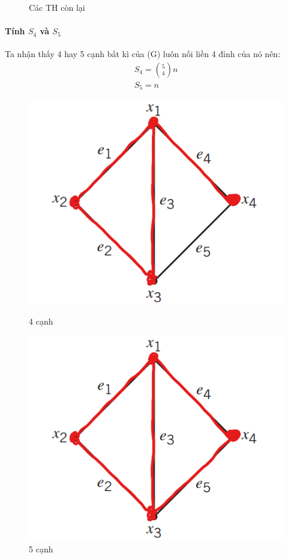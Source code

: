 \documentclass[main.tex]{subfiles}
\begin{document}
\begin{figure}[H]
\begin{minipage}{0.25\textwidth}
\captionsetup{labelformat=empty}
\caption{Các TH còn lại}
\end{minipage}
\end{figure}

\paragraph*{Tính $S_4$ và $S_5$} 
Ta nhận thấy 4 hay 5 cạnh bất kì của (G) luôn nối liền 4 đỉnh của nó nên:
\begin{gather*}
S_4 = {5\choose4}n \\
S_5 = n    
\end{gather*}

\begin{figure}[H]
\centering
\begin{minipage}{0.25\textwidth}
\includegraphics[width=\textwidth]{image/Bai6_S4.png}
\captionsetup{labelformat=empty}
\caption{4 cạnh}
\end{minipage}
\begin{minipage}{0.25\textwidth}
\includegraphics[width=\textwidth]{image/Bai6_S5.png}
\captionsetup{labelformat=empty}
\caption{5 cạnh}
\end{minipage}
\end{figure}
\end{document}

